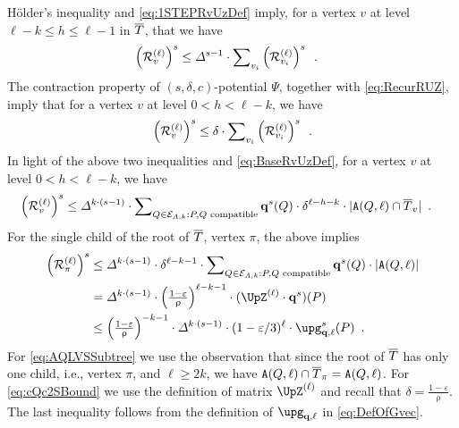 \documentclass[11pt,reqno]{amsart}
\numberwithin{equation}{section}
\newcommand{\cE}{{\mathcal{E}}}
\newcommand{\applegreen}[1]{ {\color{applegreen}#1}}
\newcommand{\amethyst}[1]{{\color{amethyst}#1} }
\newcommand{\blue}[1]{{\color{blue}#1}}
\newcommand{\bluepigment}[1]{{\color{blue(pigment)}#1}}
\newcommand{\capri}[1]{{\color{capri}#1}}
\newcommand{\cadmiumorange}[1]{{\color{cadmiumorange}#1}}
\newcommand{\darkmagenta}[1]{{\color{darkmagenta}#1}}
\newcommand{\electricviolet}[1]{{\color{electricviolet}#1}}
\newcommand{\goldenbrown}[1]{{\color{goldenbrown}#1}}
\newcommand{\iris}[1]{{\color{iris}#1}}
\newcommand{\maxDeg}{{\Delta}}
\newcommand{\ExtV}{\iris{\cE}}
\newcommand{\potF}{{\Psi}}
\newcommand{\pfs}{\darkmagenta{s}}
\newcommand{\cp}{{\tt A}}
\newcommand{\abs}[1]{\blue{|}#1\blue{|}}
\renewcommand{\applegreen}[1]{#1}
\renewcommand{\amethyst}[1]{#1}
\renewcommand{\blue}[1]{#1}
\renewcommand{\bluepigment}[1]{#1}
\renewcommand{\capri}[1]{#1}
\renewcommand{\cadmiumorange}[1]{#1}
\renewcommand{\darkmagenta}[1]{#1}
\renewcommand{\electricviolet}[1]{#1}
\renewcommand{\goldenbrown}[1]{#1}
\renewcommand{\iris}[1]{#1}
\newcommand{\kh}{\cadmiumorange{h}}
\newcommand{\ki}{\capri{i}}
\newcommand{\kk}{\bluepigment{k}}
\newcommand{\kell}{{\color{green(pigment)}\ell}}%
\newcommand{\kP}{\goldenbrown{P}}
\newcommand{\kQ}{\amethyst{Q}}
\newcommand{\kv}{\electricviolet{v}}
\renewcommand{\kh}{h}
\renewcommand{\ki}{i}
\renewcommand{\kk}{k}
\renewcommand{\kell}{\ell}
\renewcommand{\kP}{P}
\renewcommand{\kQ}{Q}
\renewcommand{\kv}{v}
\newcommand{\SingBound}{\uprho}
\begin{document}
H\"older's inequality and \eqref{eq:1STEPRvUzDef} imply,  for a vertex $\kv$ at level $\kell-\kk\leq \kh\leq \kell-1$ in $\overline{T}$, that we have
\begin{align}\label{eq:CaseVHEqLMinusK}
\left( \subcont_{\kv} \right)^{\pfs} &\leq \maxDeg^{\pfs-1} \cdot \sum\nolimits_{\kv_{\ki}}\left(\subcont_{\kv_{\ki}} \right)^{\pfs} \enspace.
\end{align}
The contraction property of $(\pfs,\delta,c)$-potential $\potF$, together with \eqref{eq:RecurRUZ},
imply that for a vertex $\kv$ at level $0<\kh<\kell-\kk$, we have 
\begin{align}\label{eq:CaseVHEqLMinusKSmaller}
\left( \subcont_{\kv} \right)^{\pfs} \leq \delta \cdot \sum\nolimits_{\kv_{\ki}} \left( \subcont_{\kv_{\ki}} \right)^{\pfs} \enspace.
\end{align} 
% 
%
% 
%
In light of the above two inequalities and \eqref{eq:BaseRvUzDef}, 
for a vertex $\kv$ at level $0<\kh < \kell-\kk$, we have
\begin{align}\nonumber 
\left( \subcont_{\kv} \right)^{\pfs} &\leq \maxDeg^{\kk\cdot(\pfs-1)}\cdot 
\sum\nolimits_{\kQ \in \ExtV_{\Lambda,\kk}: \kP,\kQ \textrm{ compatible}} \vtest^{\pfs}(\kQ) \cdot \delta^{\kell-\kh-\kk} \cdot \abs{\cp(\kQ,\kell)\cap \TPP_{\kv}} \enspace.
\end{align}
For the single child of the root of $\overline{T}$, vertex $\pi$, the above implies 
\begin{align}
\left( \subcont_{\pi} \right)^{\pfs} &\leq \maxDeg^{\kk\cdot(\pfs-1)} \cdot \delta^{\kell-\kk-1}\cdot\sum\nolimits_{\kQ \in \ExtV_{\Lambda,\kk}:\kP,\kQ \textrm{ compatible}} 
\vtest^{\pfs}(\kQ) \cdot \abs{\cp(\kQ,\kell)}
 \label{eq:AQLVSSubtree} \\ &
= \maxDeg^{\kk\cdot(\pfs-1)} \cdot \left( {\textstyle \frac{1-\varepsilon}{\SingBound} }\right)^{\kell-\kk-1 }\cdot  ( \TAdj^{(\kell)} \cdot \vtest^{\pfs} ) (\kP) 
\label{eq:cQc2SBound} \\ &
\leq \left( {\textstyle \frac{1-\varepsilon}{\SingBound} }\right)^{-\kk-1}\cdot \maxDeg^{\kk\cdot(\pfs-1)} \cdot (1-\varepsilon/3)^{\kell}\cdot \vecG^{\pfs}_{\vtest, \kell}(\kP)
\enspace. \label{eq:FinalIineqWithVegG}
\end{align}
For \eqref{eq:AQLVSSubtree} we use the observation that since the root of $\overline{T}$ has only one child, i.e., vertex $\pi$,  
and $\kell\geq 2\kk$, we  have $\cp(\kQ,\kell)\cap \TPP_{\pi}=\cp(\kQ,\kell)$. For \eqref{eq:cQc2SBound} we use the definition 
of matrix $\TAdj^{(\kell)}$ and recall that $\delta=\frac{1-\varepsilon}{\SingBound}$. 
%
The last inequality follows from the definition of $\vecG_{\vtest, \kell}$ in \eqref{eq:DefOfGvec}.
\end{document}
